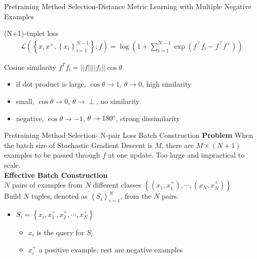 \documentclass[aspectratio=169,xcolor=dvipsnames]{beamer}
\begin{document}
\begin{frame}{Pretraining Method Selection-Distance Metric Learning with Multiple Negative Examples}
    \begin{block}{(N+1)-tuplet loss}
    \begin{align*}
        \mathcal{L}\left(\left\{x, x^{+},\left\{x_i\right\}_{i=1}^{N-1}\right\} ; f\right)=\log \left(1+\sum_{i=1}^{N-1} \exp \left(f^{\top} f_i-f^{\top} f^{+}\right)\right)
    \end{align*}
    \end{block}
    \bigskip
    Cosine similarity $f^Tf_i=\left||f\right||\left||f_i\right||\cos{\theta}$\\
    \begin{itemize}
        \item if dot product is large, $\cos{\theta} \rightarrow 1$, $\theta \rightarrow 0$, high similarity
        \item small, $\cos{\theta} \rightarrow 0$, $\theta \rightarrow \perp$, no similarity
        \item negative, $\cos{\theta} \rightarrow -1$, $\theta \rightarrow 180\degree$, strong dissimilarity
    \end{itemize}
\end{frame}


\begin{frame}{Pretraining Method Selection- N-pair Loss Batch Construction}
    \textbf{Problem} When the batch size of Stochastic Gradient Descent is $M$, there are $M \times (N+1)$ examples to be passed through $f$ at one update. Too large and impractical to scale.\\
    \bigskip
    \textbf{Effective Batch Construction}\\
    \medskip
    $N$ pairs of examples from $N$ different classes $\left\{\left(x_1, x_1^{+}\right), \cdots,\left(x_N, x_N^{+}\right)\right\}$\\
    \medskip
    Build $N$ tuples, denoted as $\left\{S_i\right\}_{i=1}^N$, from the $N$ pairs.
    \medskip
    \begin{itemize}
        \item $S_i=\left\{x_i, x_1^{+}, x_2^{+}, \cdots, x_N^{+}\right\}$
        \smallskip
        \begin{itemize}
            \item $x_i$ is the query for $S_i$ 
            \smallskip
            \item $x_i^+$ a positive example, rest are negative examples
        \end{itemize}
    \end{itemize}
\end{frame}
\end{document}
